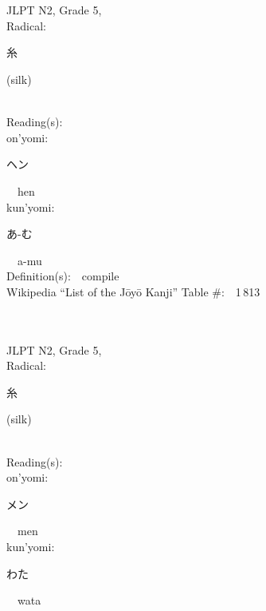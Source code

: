 \begin{multicols}{2}
\ \ \\
{\fontsize{34pt}{40pt}  }\ \ \\  %
{JLPT N2, Grade 5, \\Radical:\ \ {\begin{CJK}{UTF8}{min} 糸 \end{CJK}} (silk) } \\
Reading(s):\ \ \\
{\hspace*{1em}}on'yomi:\ \ \\
{\hspace*{2em}}{\begin{CJK}{UTF8}{min} ヘン \end{CJK}}\ \ hen\ \ \\
{\hspace*{1em}}kun'yomi:\ \ \\
{\hspace*{2em}}{\begin{CJK}{UTF8}{min} あ-む \end{CJK}}\ \ a-mu\ \ \\
Definition(s):\ \ compile \\
Wikipedia ``List of the J\=oy\=o Kanji'' Table \#:\ \ 1\,813 \\
\ \ \\
{\fontsize{34pt}{40pt}  }\ \ \\  %
{JLPT N2, Grade 5, \\Radical:\ \ {\begin{CJK}{UTF8}{min} 糸 \end{CJK}} (silk) } \\
Reading(s):\ \ \\
{\hspace*{1em}}on'yomi:\ \ \\
{\hspace*{2em}}{\begin{CJK}{UTF8}{min} メン \end{CJK}}\ \ men\ \ \\
{\hspace*{1em}}kun'yomi:\ \ \\
{\hspace*{2em}}{\begin{CJK}{UTF8}{min} わた \end{CJK}}\ \ wata\ \ \\

\end{multicols}
